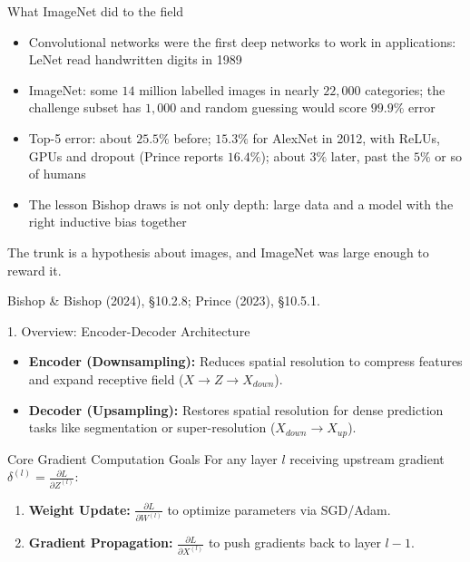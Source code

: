 \documentclass[aspectratio=169, 11pt]{beamer}
\newcommand{\srcline}[1]{%
  \par\vspace{0.25em}%
  {\scriptsize\color{mcMuted}\hfill #1\par}}
\newcommand{\src}[3]{}      %
\newcommand{\nosrc}{}       %
\begin{document}
\begin{frame}{What ImageNet did to the field}
  \src{bishop2024}{section}{10.2.8}
  \src{prince2023}{section}{10.5.1}
  \vspace{0.1em}
  {\footnotesize
  \begin{itemize}\itemsep0.30em
    \item Convolutional networks were the first deep networks to work
          in applications: LeNet read handwritten digits in 1989
    \item ImageNet: some $14$ million labelled images in nearly
          $22{,}000$ categories; the challenge subset has $1{,}000$ and
          random guessing would score $99.9\%$ error
    \item Top-5 error: about $25.5\%$ before; $15.3\%$ for AlexNet in
          2012, with ReLUs, GPUs and dropout (Prince reports $16.4\%$);
          about $3\%$ later, past the $5\%$ or so of humans
    \item The lesson Bishop draws is not only depth: large data and a
          model with the \alert{right inductive bias} together
  \end{itemize}}
  \vspace{-0.1em}
  \begin{redhighlight}
    The trunk is a hypothesis about images, and ImageNet was large
    enough to reward it.
  \end{redhighlight}
  \vspace{-0.3em}
  \srcline{Bishop \& Bishop (2024), \S10.2.8; Prince (2023), \S10.5.1.}
\end{frame}

\begin{frame}{1. Overview: Encoder-Decoder Architecture}
  \nosrc
  \begin{itemize}
    \item \textbf{Encoder (Downsampling):} Reduces spatial resolution to compress features and expand receptive field ($X \to Z \to X_{down}$).
    \item \textbf{Decoder (Upsampling):} Restores spatial resolution for dense prediction tasks like segmentation or super-resolution ($X_{down} \to X_{up}$).
  \end{itemize}
  
  \vspace{0.3cm}
  \begin{block}{Core Gradient Computation Goals}
    For any layer $l$ receiving upstream gradient $\delta^{(l)} = \frac{\partial L}{\partial Z^{(l)}}$:
    \begin{enumerate}
      \item \textbf{Weight Update:} $\frac{\partial L}{\partial W^{(l)}}$ to optimize parameters via SGD/Adam.
      \item \textbf{Gradient Propagation:} $\frac{\partial L}{\partial X^{(l)}}$ to push gradients back to layer $l-1$.
    \end{enumerate}
  \end{block}
\end{frame}
\end{document}
